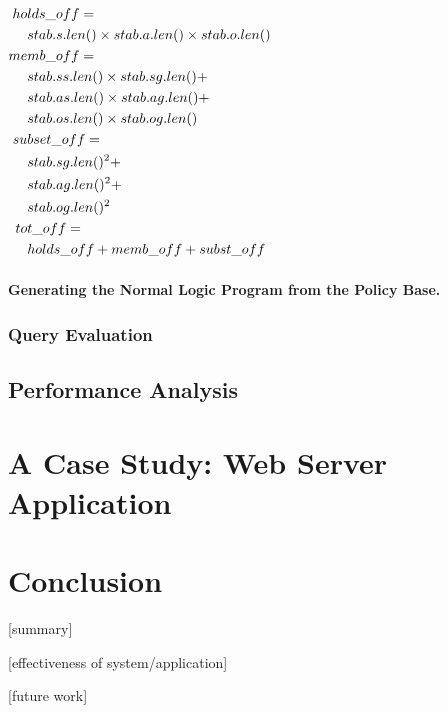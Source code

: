 \documentclass[10pt, twocolumn]{article}
\begin{document}
          \begin{math}
            \begin{aligned}[t]
              ho&lds\_off = \\
              &stab.s.len() \times stab.a.len() \times stab.o.len() \\
              me&mb\_off = \\
              &stab.ss.len() \times stab.sg.len() + \\
              &stab.as.len() \times stab.ag.len() + \\
              &stab.os.len() \times stab.og.len() \\
              su&bset\_off = \\
              &stab.sg.len()\sp{2} + \\
              &stab.ag.len()\sp{2} + \\
              &stab.og.len()\sp{2} \\
              to&t\_off = \\
              &holds\_off + memb\_off + subst\_off
            \end{aligned}
          \end{math}

        \paragraph{Generating the Normal Logic Program from the Policy Base.}

      \subsubsection{Query Evaluation}

    \subsection{Performance Analysis}

  \section{A Case Study: Web Server Application}

  \section{Conclusion}

    [summary]

    [effectiveness of system/application]

    [future work]
\end{document}
